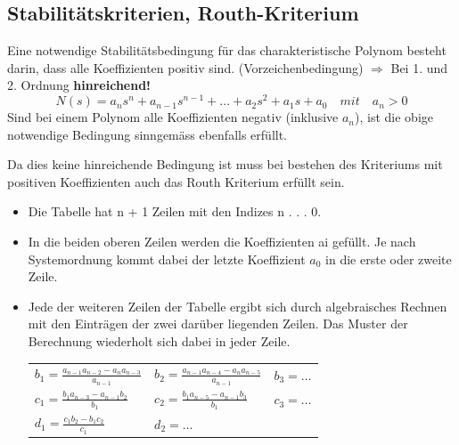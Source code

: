 \clearpage
\subsection{Stabilitätskriterien, Routh-Kriterium  }

Eine notwendige Stabilitätsbedingung für das charakteristische Polynom besteht darin, dass alle Koeffizienten positiv sind. (Vorzeichenbedingung) $\Rightarrow$ Bei 1. und 2. Ordnung \textbf{hinreichend!}
\begin{equation}
\boxed{N(s) = a_{n}s^n + a_{n-1}s^{n-1} + . . . + a_2s^2 + a_1s + a_0 \quad mit \quad a_n > 0}
\end{equation}
Sind bei einem Polynom alle Koeffizienten negativ (inklusive $a_n$), ist die obige
notwendige Bedingung sinngemäss ebenfalls erfüllt.



Da dies keine hinreichende Bedingung ist muss bei bestehen des Kriteriums mit positiven Koeffizienten auch das Routh Kriterium erfüllt sein.
\begin{itemize}
	\item Die Tabelle hat n + 1 Zeilen mit den Indizes n . . . 0.
	\item In die beiden oberen Zeilen werden die Koeffizienten ai gefüllt. Je nach Systemordnung
	kommt dabei der letzte Koeffizient $a_0$ in die erste oder zweite Zeile.
	
	\item {Jede der weiteren Zeilen der Tabelle ergibt sich durch algebraisches Rechnen
	mit den Einträgen der zwei darüber liegenden Zeilen. Das Muster der Berechnung
	wiederholt sich dabei in jeder Zeile.\\
	\begin{tabularx}{\textwidth}{XXX}
	$b_1=\frac{a_{n-1}a_{n-2}-a_{n}a_{n-3}}{a_{n-1}}$
	& $b_2=\frac{a_{n-1}a_{n-4}-a_{n}a_{n-5}}{a_{n-1}}$
	& $b_3=\ldots$ \\
	$c_1=\frac{b_{1}a_{n-3}-a_{n-1}b_{2}}{b_{1}}$
	& $c_2=\frac{b_{1}a_{n-5}-a_{n-1}b_{3}}{b_{1}}$
	& $c_3=\ldots$ \\
	$d_1=\frac{c_{1}b_{2}-b_{1}c_{2}}{c_{1}}$
	& $d_2=\ldots$ & \\
	\end{tabularx}}
\end{itemize}

